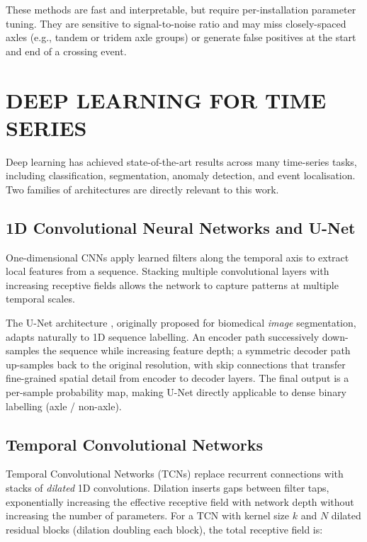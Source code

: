 These methods are fast and interpretable, but require per-installation parameter
tuning. They are sensitive to signal-to-noise ratio and may miss closely-spaced
axles (e.g., tandem or tridem axle groups) or generate false positives at the
start and end of a crossing event.

\section{DEEP LEARNING FOR TIME SERIES}

Deep learning has achieved state-of-the-art results across many time-series
tasks, including classification, segmentation, anomaly detection, and event
localisation. Two families of architectures are directly relevant to this work.

\subsection{1D Convolutional Neural Networks and U-Net}

One-dimensional CNNs apply learned filters along the temporal axis to extract
local features from a sequence. Stacking multiple convolutional layers with
increasing receptive fields allows the network to capture patterns at multiple
temporal scales.

The U-Net architecture \cite{Ronneberger2015}, originally proposed for biomedical
\emph{image} segmentation, adapts naturally to 1D sequence labelling. An encoder
path successively down-samples the sequence while increasing feature depth; a
symmetric decoder path up-samples back to the original resolution, with skip
connections that transfer fine-grained spatial detail from encoder to decoder
layers. The final output is a per-sample probability map, making U-Net directly
applicable to dense binary labelling (axle / non-axle).

\subsection{Temporal Convolutional Networks}

Temporal Convolutional Networks (TCNs) \cite{Bai2018} replace recurrent
connections with stacks of \emph{dilated} 1D convolutions. Dilation inserts gaps
between filter taps, exponentially increasing the effective receptive field with
network depth without increasing the number of parameters. For a TCN with kernel
size $k$ and $N$ dilated residual blocks (dilation doubling each block), the
total receptive field is:


